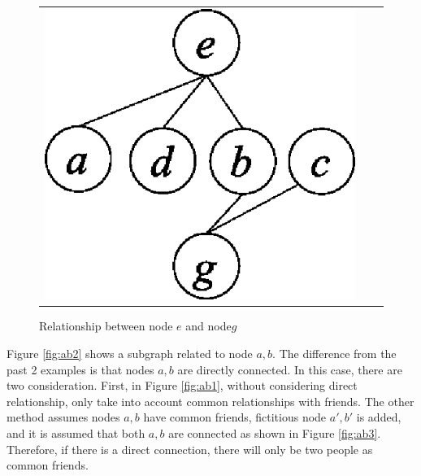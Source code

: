 \begin{figure}[htbp]
\begin{center}
\begin{tabular}{ccc}
\begin{minipage}{0.2\hsize}
\begin{center}
\includegraphics[scale=0.5]{./eg.eps}
\caption{Relationship between node $e$ and node$g$\label{fig:eg}}
\end{center}
\end{minipage}

\end{tabular}
\end{center}
\end{figure}

Figure \ref{fig:ab2} shows a subgraph related to node $a,b$. The difference from the past 2 examples is that nodes $a,b$ are directly connected. In this case, there are two consideration. 
First, in Figure \ref{fig:ab1}, without considering direct relationship, only take into account common relationships with friends. 
The other method assumes nodes $a,b$ have common friends, fictitious node $a',b'$ is added, and it is assumed that both $a,b$ are connected as shown in Figure \ref{fig:ab3}. 
Therefore, if there is a direct connection, there will only be two people as common friends. 


